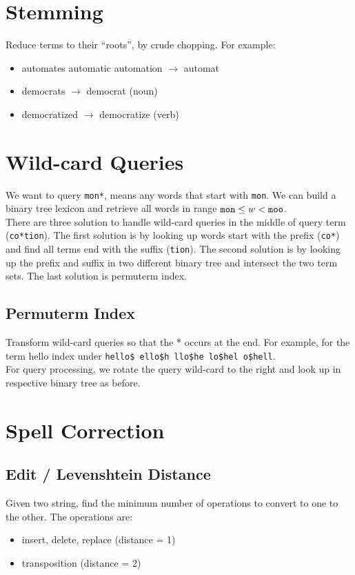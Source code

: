 \begin{multicols*}{2}
\section{Stemming}
\noindent Reduce terms to their “roots”, by crude chopping. For example:
\begin{itemize}
    \item automates automatic automation $\rightarrow$ automat
    \item democrats $\rightarrow$ democrat (noun)
    \item democratized $\rightarrow$ democratize (verb)
\end{itemize}

\section{Wild-card Queries}
\noindent We want to query \verb|mon*|, means any words that start with \verb|mon|. We can build a binary tree lexicon and retrieve all words in range $\verb|mon|\le w < \verb|moo|$. \\

\noindent There are three solution to handle wild-card queries in the middle of query term (\verb|co*tion|). The first solution is by looking up words start with the prefix (\verb|co*|) and find all terms end with the suffix (\verb|tion|). The second solution is by looking up the prefix and suffix in two different binary tree and intersect the two term sets. The last solution is permuterm index. 

\subsection{Permuterm Index}
\noindent Transform wild-card queries so that the * occurs at the end. For example, for the term hello index under \verb|hello$ ello$h llo$he lo$hel o$hell|. \\

\noindent For query processing, we rotate the query wild-card to the right and look up in respective binary tree as before. 

\section{Spell Correction}
\subsection{Edit / Levenshtein Distance}
\noindent Given two string, find the minimum number of operations to convert to one to the other. The operations are:
\begin{itemize}
    \item insert, delete, replace (distance = 1)
    \item transposition (distance = 2)
\end{itemize}


\end{multicols*}
